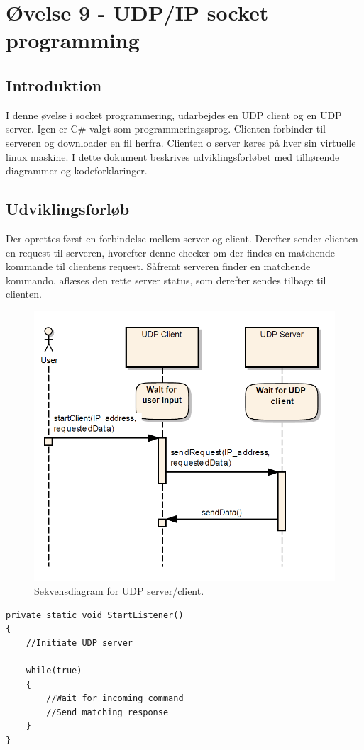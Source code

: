 \section{Øvelse 9 - UDP/IP socket programming}

\subsection{Introduktion}
I denne øvelse i socket programmering, udarbejdes en UDP client og en UDP server. Igen er C\# valgt som programmeringssprog. Clienten forbinder til serveren og downloader en fil herfra. Clienten o server køres på hver sin virtuelle linux maskine. I dette dokument beskrives udviklingsforløbet med tilhørende diagrammer og kodeforklaringer.

\subsection{Udviklingsforløb}
Der oprettes først en forbindelse mellem server og client. Derefter sender clienten en request til serveren, hvorefter denne checker om der findes en matchende kommande til clientens request.
Såfremt serveren finder en matchende kommando, aflæses den rette server status, som derefter sendes tilbage til clienten.

\begin{figure}[h]
	\centering
	\includegraphics[width=0.8\linewidth]{figs/sequence2.png}
	\caption{Sekvensdiagram for UDP server/client.}
	\label{fig:sequence2}
\end{figure}

\begin{lstlisting}[caption = Hoveddesign for server,label=code:udpServer]
private static void StartListener() 
{
	//Initiate UDP server
	
	while(true) 
	{
		//Wait for incoming command
		//Send matching response
	}
}
\end{lstlisting}

